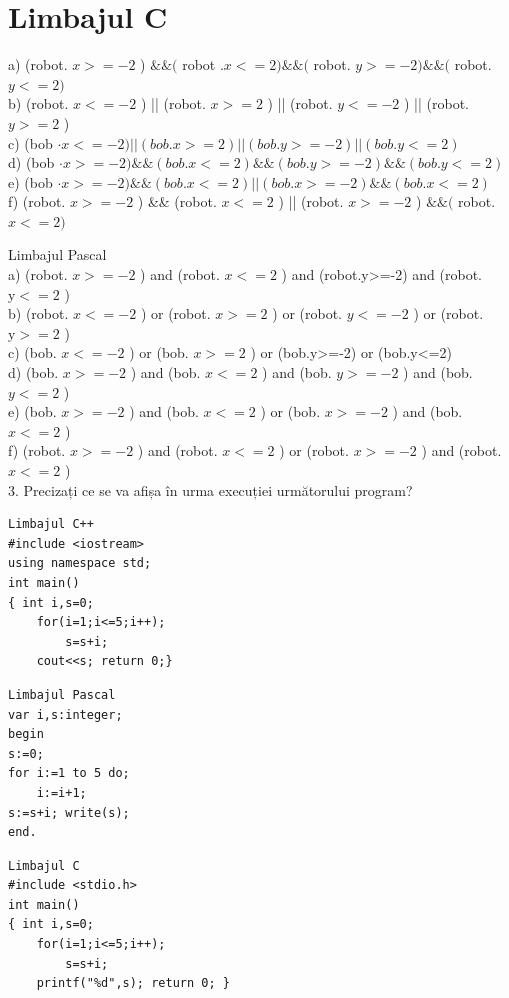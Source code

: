 \documentclass[10pt]{article}
\begin{document}
\section*{Limbajul C}
a) (robot. $x>=-2$ ) $\& \&($ robot $. x<=2) \& \&($ robot. $y>=-2) \& \&($ robot. $y<=2)$\\
b) (robot. $x<=-2$ ) || (robot. $x>=2$ ) || (robot. $y<=-2$ ) || (robot. $y>=2$ )\\
c) (bob $\cdot x<=-2)||(b o b . x>=2)||(b o b . y>=-2)|\mid(b o b . y<=2)$\\
d) (bob $\cdot x>=-2) \& \&(b o b . x<=2) \& \&(b o b . y>=-2) \& \&(b o b . y<=2)$\\
e) (bob $\cdot x>=-2) \& \&(b o b . x<=2)|\mid(b o b . x>=-2) \& \&(b o b . x<=2)$\\
f) (robot. $x>=-2$ ) \&\& (robot. $x<=2$ ) || (robot. $x>=-2$ ) $\& \&($ robot. $x<=2)$

Limbajul Pascal\\
a) (robot. $x>=-2$ ) and (robot. $x<=2$ ) and (robot.y>=-2) and (robot. $\mathrm{y}<=2$ )\\
b) (robot. $x<=-2$ ) or (robot. $x>=2$ ) or (robot. $y<=-2$ ) or (robot. $\mathrm{y}>=2$ )\\
c) (bob. $x<=-2$ ) or (bob. $x>=2$ ) or (bob.y>=-2) or (bob.y<=2)\\
d) (bob. $x>=-2$ ) and (bob. $x<=2$ ) and (bob. $y>=-2$ ) and (bob. $y<=2$ )\\
e) (bob. $x>=-2$ ) and (bob. $x<=2$ ) or (bob. $x>=-2$ ) and (bob. $x<=2$ )\\
f) (robot. $x>=-2$ ) and (robot. $x<=2$ ) or (robot. $x>=-2$ ) and (robot. $x<=2$ )\\
3. Precizați ce se va afișa în urma execuției următorului program?

\begin{verbatim}
Limbajul C++
#include <iostream>
using namespace std;
int main()
{ int i,s=0;
    for(i=1;i<=5;i++);
        s=s+i;
    cout<<s; return 0;}
\end{verbatim}

\begin{verbatim}
Limbajul Pascal
var i,s:integer;
begin
s:=0;
for i:=1 to 5 do;
    i:=i+1;
s:=s+i; write(s);
end.
\end{verbatim}

\begin{verbatim}
Limbajul C
#include <stdio.h>
int main()
{ int i,s=0;
    for(i=1;i<=5;i++);
        s=s+i;
    printf("%d",s); return 0; }
\end{verbatim}
\end{document}
